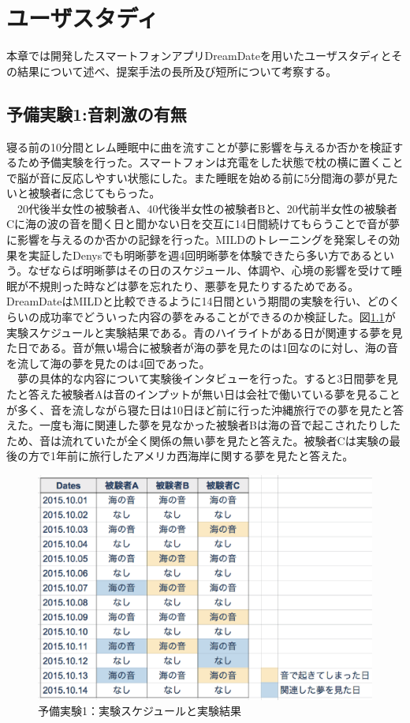 \chapter{ユーザスタディ}
\label{chap:visualize}

本章では開発したスマートフォンアプリDreamDateを用いたユーザスタディとその結果について述べ、提案手法の長所及び短所について考察する。

\section{予備実験1:音刺激の有無}
寝る前の10分間とレム睡眠中に曲を流すことが夢に影響を与えるか否かを検証するため予備実験を行った。スマートフォンは充電をした状態で枕の横に置くことで脳が音に反応しやすい状態にした。また睡眠を始める前に5分間海の夢が見たいと被験者に念じてもらった。\\
　20代後半女性の被験者A、40代後半女性の被験者Bと、20代前半女性の被験者Cに海の波の音を聞く日と聞かない日を交互に14日間続けてもらうことで音が夢に影響を与えるのか否かの記録を行った。MILDのトレーニングを発案しその効果を実証したDenysでも明晰夢を週4回明晰夢を体験できたら多い方であるという\cite{LaBerge}。なぜならば明晰夢はその日のスケジュール、体調や、心境の影響を受けて睡眠が不規則った時などは夢を忘れたり、悪夢を見たりするためである。DreamDateはMILDと比較できるように14日間という期間の実験を行い、どのくらいの成功率でどういった内容の夢をみることができるのか検証した。図\ref{experiment1}が実験スケジュールと実験結果である。青のハイライトがある日が関連する夢を見た日である。音が無い場合に被験者が海の夢を見たのは1回なのに対し、海の音を流して海の夢を見たのは4回であった。\\
　夢の具体的な内容について実験後インタビューを行った。すると3日間夢を見たと答えた被験者Aは音のインプットが無い日は会社で働いている夢を見ることが多く、音を流しながら寝た日は10日ほど前に行った沖縄旅行での夢を見たと答えた。一度も海に関連した夢を見なかった被験者Bは海の音で起こされたりしたため、音は流れていたが全く関係の無い夢を見たと答えた。被験者Cは実験の最後の方で1年前に旅行したアメリカ西海岸に関する夢を見たと答えた。

\begin{figure}[htbp]
\begin{center}
\includegraphics[width=13cm]{eps/schedule0.eps}
\caption{予備実験1：実験スケジュールと実験結果}
\label{experiment1}
\end{center}
\end{figure}

